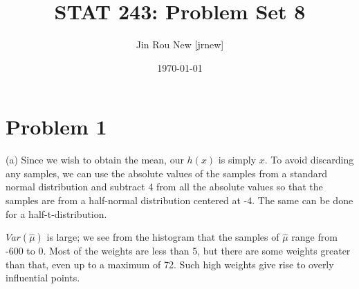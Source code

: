 \documentclass{article}\usepackage[]{graphicx}\usepackage[]{color}
\title{STAT 243: Problem Set 8}
\author{Jin Rou New [jrnew]}
\date{\today}
\begin{document}
\maketitle

\section{Problem 1}
(a)
Since we wish to obtain the mean, our $h(x)$ is simply $x$. To avoid discarding any samples, we can use the absolute values of the samples from a standard normal distribution and subtract 4 from all the absolute values so that the samples are from a half-normal distribution centered at -4. The same can be done for a half-t-distribution.

$Var(\hat{\mu})$ is large; we see from the histogram that the samples of $\hat{\mu}$ range from -600 to 0. Most of the weights are less than 5, but there are some weights greater than that, even up to a maximum of 72. Such high weights give rise to overly influential points.
\end{document}
